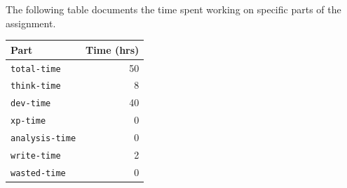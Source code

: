 \documentclass{acm_proc_article-sp}
\begin{document}
The following table documents the time spent working on specific parts of the assignment.

\begin{tabular}{ | l | r | }
	\hline
	Part & Time (hrs) \\ \hline \hline
	\texttt{total-time} & 50\\ \hline
	\texttt{think-time} & 8\\ \hline
	\texttt{dev-time} & 40\\ \hline
	\texttt{xp-time} & 0\\ \hline
	\texttt{analysis-time} & 0\\ \hline
	\texttt{write-time} & 2\\ \hline
	\texttt{wasted-time} & 0\\ \hline
\end{tabular}
\end{document}
